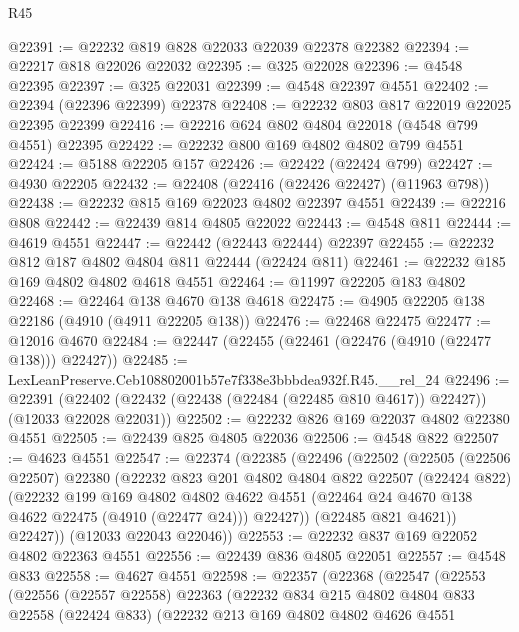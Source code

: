 \begin{lexlean}{R45}
\begin{coremodule}
@22391 := @22232 @819 @828 @22033 @22039 @22378 @22382
@22394 := @22217 @818 @22026 @22032
@22395 := @325 @22028
@22396 := @4548 @22395
@22397 := @325 @22031
@22399 := @4548 @22397 @4551
@22402 := @22394 (@22396 @22399) @22378
@22408 := @22232 @803 @817 @22019 @22025 @22395 @22399
@22416 := @22216 @624 @802 @4804 @22018 (@4548 @799 @4551) @22395
@22422 := @22232 @800 @169 @4802 @4802 @799 @4551
@22424 := @5188 @22205 @157
@22426 := @22422 (@22424 @799)
@22427 := @4930 @22205
@22432 := @22408 (@22416 (@22426 @22427) (@11963 @798))
@22438 := @22232 @815 @169 @22023 @4802 @22397 @4551
@22439 := @22216 @808
@22442 := @22439 @814 @4805 @22022
@22443 := @4548 @811
@22444 := @4619 @4551
@22447 := @22442 (@22443 @22444) @22397
@22455 := @22232 @812 @187 @4802 @4804 @811 @22444 (@22424 @811)
@22461 := @22232 @185 @169 @4802 @4802 @4618 @4551
@22464 := @11997 @22205 @183 @4802
@22468 := @22464 @138 @4670 @138 @4618
@22475 := @4905 @22205 @138 @22186 (@4910 (@4911 @22205 @138))
@22476 := @22468 @22475
@22477 := @12016 @4670
@22484 := @22447 (@22455 (@22461 (@22476 (@4910 (@22477 @138))) @22427))
@22485 := LexLeanPreserve.Ceb108802001b57e7f338e3bbbdea932f.R45.__rel_24
@22496 := @22391
    (@22402 (@22432 (@22438 (@22484 (@22485 @810 @4617)) @22427)) (@12033 @22028 @22031))
@22502 := @22232 @826 @169 @22037 @4802 @22380 @4551
@22505 := @22439 @825 @4805 @22036
@22506 := @4548 @822
@22507 := @4623 @4551
@22547 := @22374
    (@22385
      (@22496
        (@22502
          (@22505
            (@22506 @22507)
            @22380
            (@22232
              @823
              @201
              @4802
              @4804
              @822
              @22507
              (@22424 @822)
              (@22232
                @199
                @169
                @4802
                @4802
                @4622
                @4551
                (@22464 @24 @4670 @138 @4622 @22475 (@4910 (@22477 @24)))
                @22427))
            (@22485 @821 @4621))
          @22427))
      (@12033 @22043 @22046))
@22553 := @22232 @837 @169 @22052 @4802 @22363 @4551
@22556 := @22439 @836 @4805 @22051
@22557 := @4548 @833
@22558 := @4627 @4551
@22598 := @22357
    (@22368
      (@22547
        (@22553
          (@22556
            (@22557 @22558)
            @22363
            (@22232
              @834
              @215
              @4802
              @4804
              @833
              @22558
              (@22424 @833)
              (@22232
                @213
                @169
                @4802
                @4802
                @4626
                @4551

\end{coremodule}
\end{lexlean}
